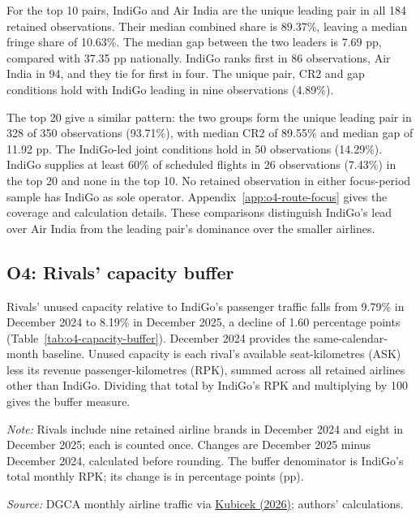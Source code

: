 \documentclass[12pt,a4paper]{article}
\begin{document}
For the top 10 pairs, IndiGo and Air India are the unique leading pair in all 184 retained observations. Their median combined share is 89.37\%, leaving a median fringe share of 10.63\%. The median gap between the two leaders is 7.69 pp, compared with 37.35 pp nationally. IndiGo ranks first in 86 observations, Air India in 94, and they tie for first in four. The unique pair, CR2 and gap conditions hold with IndiGo leading in nine observations (4.89\%).

The top 20 give a similar pattern: the two groups form the unique leading pair in 328 of 350 observations (93.71\%), with median CR2 of 89.55\% and median gap of 11.92 pp. The IndiGo-led joint conditions hold in 50 observations (14.29\%). IndiGo supplies at least 60\% of scheduled flights in 26 observations (7.43\%) in the top 20 and none in the top 10. No retained observation in either focus-period sample has IndiGo as sole operator. Appendix~\ref{app:o4-route-focus} gives the coverage and calculation details. These comparisons distinguish IndiGo's lead over Air India from the leading pair's dominance over the smaller airlines.

\clearpage
\subsection{O4: Rivals' capacity buffer}
Rivals' unused capacity relative to IndiGo's passenger traffic falls from 9.79\% in December 2024 to 8.19\% in December 2025, a decline of 1.60 percentage points (Table~\ref{tab:o4-capacity-buffer}). December 2024 provides the same-calendar-month baseline. Unused capacity is each rival's available seat-kilometres (ASK) less its revenue passenger-kilometres (RPK), summed across all retained airlines other than IndiGo. Dividing that total by IndiGo's RPK and multiplying by 100 gives the buffer measure.

\begin{minipage}{\linewidth}
\captionsetup{font=small,labelfont=bf,justification=raggedright,singlelinecheck=false,hypcap=false}
\label{tab:o4-capacity-buffer}
\centering
{\small{}\setlength{\tabcolsep}{5pt}\par}
\vspace{4pt}
{\footnotesize{}\raggedright\textit{Note:} Rivals include nine retained airline brands in December 2024 and eight in December 2025; each is counted once. Changes are December 2025 minus December 2024, calculated before rounding. The buffer denominator is IndiGo's total monthly RPK; its change is in percentage points (pp).\par
\textit{Source:} DGCA monthly airline traffic via \href{https://github.com/mkubicek/india-aviation-stats/tree/16770ac59dae61ce7b80fd8bd67dd7f4cef280a6}{Kubicek (2026)}; authors' calculations.\par}
\end{minipage}
\end{document}
